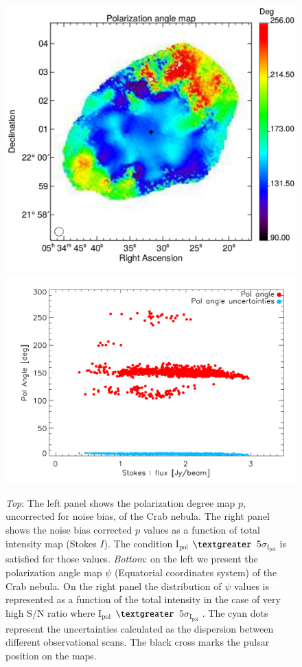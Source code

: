 \documentclass[twocolumn,traditabstract]{aa}
\begin{document}
\begin{figure}
\includegraphics[clip, angle=0, scale = 0.35]{figures/Crab_angle_v3_2mm.pdf}
\includegraphics[clip, angle=0, scale = 0.5]{figures/pol_angle_vs_I_2mm.pdf}
\caption{{\it Top}: 
The left panel shows the polarization degree map $p$, uncorrected for noise bias, of the Crab nebula. The right panel shows the noise bias
  corrected $p$ values as a function of total intensity map (Stokes $I$). 
  The condition $\textrm{I}_\textrm{pol}$ $\textgreater$ 5$\sigma_{\textrm{I}_\textrm{pol}}$ is satisfied for those values. {\it
    Bottom}: on the left we present the polarization angle map $\psi$ (Equatorial coordinates system) of the
  Crab nebula. On the right panel the distribution of $\psi$ values is represented as a function of the total intensity in the case of very high S/N ratio where
 $\textrm{I}_\textrm{pol}$ $\textgreater$ 5$\sigma_{\textrm{I}_\textrm{pol}}$ . The cyan dots represent the uncertainties calculated as the dispersion between different observational scans. The black cross marks the pulsar position on the maps.
  }
\label{fig:pol_degree}
\end{figure}
\end{document}
